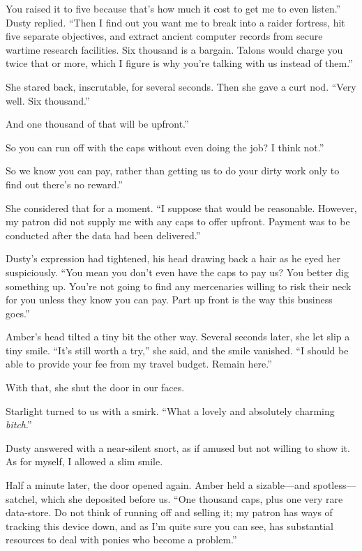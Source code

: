\leavevmode{}You raised it to five because that’s how much it cost to get me to even listen.” Dusty replied. “Then I find out you want me to break into a raider fortress, hit five separate objectives, and extract ancient computer records from secure wartime research facilities. Six thousand is a bargain. Talons would charge you twice that or more, which I figure is why you’re talking with us instead of them.”

She stared back, inscrutable, for several seconds. Then she gave a curt nod. “Very well. Six thousand.”

\leavevmode{}And one thousand of that will be upfront.”

\leavevmode{}So you can run off with the caps without even doing the job? I think not.”

\leavevmode{}So we know you can pay, rather than getting us to do your dirty work only to find out there’s no reward.”

She considered that for a moment. “I suppose that would be reasonable. However, my patron did not supply me with any caps to offer upfront. Payment was to be conducted after the data had been delivered.”

Dusty’s expression had tightened, his head drawing back a hair as he eyed her suspiciously. “You mean you don’t even have the caps to pay us? You better dig something up. You’re not going to find any mercenaries willing to risk their neck for you unless they know you can pay. Part up front is the way this business goes.”

Amber’s head tilted a tiny bit the other way. Several seconds later, she let slip a tiny smile. “It’s still worth a try,” she said, and the smile vanished. “I should be able to provide your fee from my travel budget. Remain here.”

With that, she shut the door in our faces.

Starlight turned to us with a smirk. “What a lovely and absolutely charming \textit{bitch}.”

Dusty answered with a near-silent snort, as if amused but not willing to show it. As for myself, I allowed a slim smile.

Half a minute later, the door opened again. Amber held a sizable—and spotless—satchel, which she deposited before us. “One thousand caps, plus one very rare data-store. Do not think of running off and selling it; my patron has ways of tracking this device down, and as I’m quite sure you can see, has substantial resources to deal with ponies who become a problem.”

